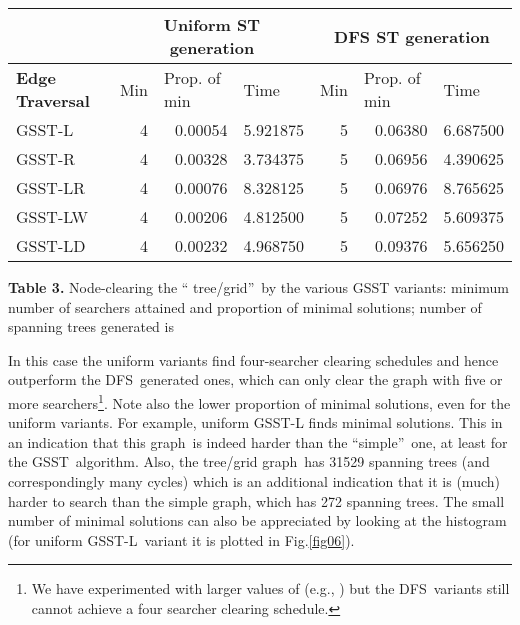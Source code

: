 \documentclass[11pt]{article}\usepackage{amsmath}
\begin{document}
\begin{center}\begin{tabular}
[c]{|l|l|l|l|l|l|l|}\hline
& \multicolumn{3}{|c}{\textbf{Uniform ST generation}} &
\multicolumn{3}{|c|}{\textbf{DFS ST generation}}\\\hline
\textbf{Edge Traversal} & Min & Prop. of min & Time & Min & Prop. of min &
Time\\\hline
GSST-L & \multicolumn{1}{|r|}{4} & \multicolumn{1}{|r|}{0.00054} &
\multicolumn{1}{|r|}{5.921875} & \multicolumn{1}{|r|}{5} &
\multicolumn{1}{|r|}{0.06380} & \multicolumn{1}{|r|}{6.687500}\\\hline
GSST-R & \multicolumn{1}{|r|}{4} & \multicolumn{1}{|r|}{0.00328} &
\multicolumn{1}{|r|}{3.734375} & \multicolumn{1}{|r|}{5} &
\multicolumn{1}{|r|}{0.06956} & \multicolumn{1}{|r|}{4.390625}\\\hline
GSST-LR & \multicolumn{1}{|r|}{4} & \multicolumn{1}{|r|}{0.00076} &
\multicolumn{1}{|r|}{8.328125} & \multicolumn{1}{|r|}{5} &
\multicolumn{1}{|r|}{0.06976} & \multicolumn{1}{|r|}{8.765625}\\\hline
GSST-LW & \multicolumn{1}{|r|}{4} & \multicolumn{1}{|r|}{0.00206} &
\multicolumn{1}{|r|}{4.812500} & \multicolumn{1}{|r|}{5} &
\multicolumn{1}{|r|}{0.07252} & \multicolumn{1}{|r|}{5.609375}\\\hline
GSST-LD & \multicolumn{1}{|r|}{4} & \multicolumn{1}{|r|}{0.00232} &
\multicolumn{1}{|r|}{4.968750} & \multicolumn{1}{|r|}{5} &
\multicolumn{1}{|r|}{0.09376} & \multicolumn{1}{|r|}{5.656250}\\\hline
\end{tabular}



\end{center}

\noindent\textbf{Table 3. }Node-clearing the \textquotedblleft
tree/grid\textquotedblright\ by the various GSST variants: minimum number of
searchers attained and proportion of minimal solutions; number of spanning
trees generated is \textbf{ }

\bigskip

In this case the uniform variants find four-searcher clearing schedules and
hence outperform the DFS\ generated ones, which can only clear the graph with
five or more searchers\footnote{We have experimented with larger values of 
(e.g., ) but the DFS\ variants still cannot achieve a four searcher
clearing schedule.}. Note also the lower proportion of minimal solutions, even
for the uniform variants. For example, uniform GSST-L finds  minimal solutions. This in an indication that this
graph\ is indeed harder than the \textquotedblleft simple\textquotedblright \ one, at least for the GSST\ algorithm. Also, the tree/grid graph\ has 31529
spanning trees (and correspondingly many cycles) which is an additional
indication that it is (much) harder to search than the simple graph, which has
272 spanning trees. The small number of minimal solutions can also be
appreciated by looking at the histogram (for uniform GSST-L\ variant it is
plotted in Fig.\ref{fig06}).
\end{document}
